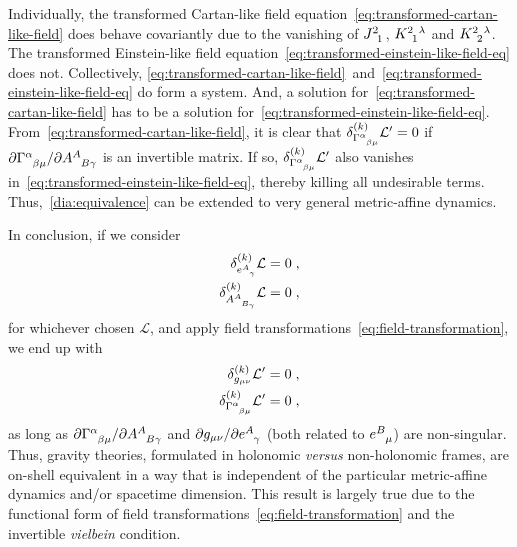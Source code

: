 \documentclass[../../main.tex]{subfiles}
\begin{document}
Individually, the transformed Cartan-like field equation~\eqref{eq:transformed-cartan-like-field} does behave covariantly due to the vanishing of $\tensor{J}{^2_1}$, $\tensor{K}{^2_1^\lambda}$ and $\tensor{K}{^2_2^\lambda}$. The transformed Einstein-like field equation~\eqref{eq:transformed-einstein-like-field-eq} does not. Collectively, \eqref{eq:transformed-cartan-like-field}~and~\eqref{eq:transformed-einstein-like-field-eq} do form a system. And, a solution for~\eqref{eq:transformed-cartan-like-field} has to be a solution for~\eqref{eq:transformed-einstein-like-field-eq}. From~\eqref{eq:transformed-cartan-like-field}, it is clear that $\delta^{(k)}_{\tensor{\Gamma}{^\alpha_{\beta\mu}}}\mathcal{L}'=0$ if $\partial \tensor{\Gamma}{^\alpha_{\beta\mu}} / \partial \tensor{A}{^A_{B\gamma}}$ is an invertible matrix. If so, $\delta^{(k)}_{\tensor{\Gamma}{^\alpha_{\beta\mu}}}\mathcal{L}'$ also vanishes in~\eqref{eq:transformed-einstein-like-field-eq}, thereby killing all undesirable terms. Thus,~\ref{dia:equivalence} can be extended to very general metric-affine dynamics.

In conclusion, if we consider
\begin{subequations}
  \begin{align}
    \delta^{(k)}_{\tensor{e}{^A_\gamma}}\mathcal{L}     & = 0 \;, \\
    \delta^{(k)}_{\tensor{A}{^A_{B_\gamma}}}\mathcal{L} & = 0 \;,
  \end{align}
\end{subequations}
for whichever chosen $\mathcal{L}$, and apply field transformations~\eqref{eq:field-transformation}, we end up with
\begin{subequations}\label{eq:non-standard-field-eq-transf-for-gravity-simplified}
  \begin{align}
    \delta^{(k)}_{g_{\mu\nu}} \mathcal{L}'                          & = 0 \;, \\
    \delta^{(k)}_{\tensor{\Gamma}{^\alpha_{\beta\mu}}} \mathcal{L}' & = 0 \;,
  \end{align}
\end{subequations}
as long as $\partial \tensor{\Gamma}{^\alpha_{\beta\mu}} / \partial \tensor{A}{^A_{B\gamma}}$ and $ \partial g_{ \mu \nu } / \partial \tensor{e}{^A_{\gamma}} $ (both related to $\tensor{e}{^B_\mu}$) are non-singular. Thus, gravity theories, formulated in holonomic \textit{versus} non-holonomic frames, are on-shell equivalent in a way that is independent of the particular metric-affine dynamics and/or spacetime dimension. This result is largely true due to the functional form of field transformations~\eqref{eq:field-transformation} and the invertible \textit{vielbein} condition.
\end{document}
